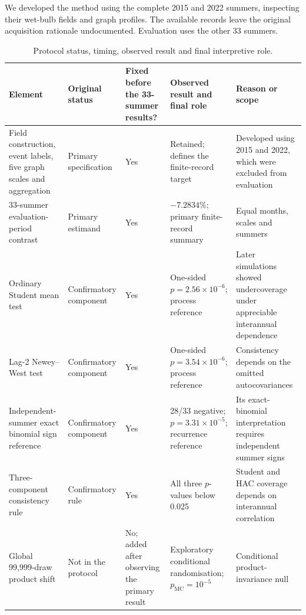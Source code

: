 \documentclass[namedate,webpdf,modern,mediumone]{oup-authoring-template}
\theoremstyle{thmstyleone}
\begin{document}
We developed the method using the complete 2015 and 2022 summers, inspecting
their wet-bulb fields and graph profiles. The available records leave the
original acquisition rationale undocumented. Evaluation uses the other
33 summers.

\footnotesize
\setlength{\tabcolsep}{3pt}
\begin{table}[!htbp]
\centering
\footnotesize
\caption{Protocol status, timing, observed result and final interpretive role.}
\label{tab:status}
\begin{tabular}{Z{0.17\textwidth}Z{0.16\textwidth}Z{0.15\textwidth}Z{0.24\textwidth}Z{0.19\textwidth}}
\toprule
Element & Original status & Fixed before the 33-summer results? & Observed result and final role & Reason or scope \\
\midrule
Field construction, event labels, five graph scales and aggregation &
Primary specification & Yes & Retained; defines the finite-record target &
Developed using 2015 and 2022, which were excluded from evaluation \\

33-summer evaluation-period contrast &
Primary estimand & Yes & $-7.2834\%$; primary finite-record summary &
Equal months, scales and summers \\

Ordinary Student mean test &
Confirmatory component & Yes & One-sided $p=2.56\times10^{-6}$; process reference &
Later simulations showed undercoverage under appreciable interannual dependence \\

Lag-2 Newey--West test &
Confirmatory component & Yes & One-sided $p=3.54\times10^{-6}$; process reference &
Consistency depends on the omitted autocovariances \\

Independent-summer exact binomial sign reference &
Confirmatory component & Yes & 28/33 negative; $p=3.31\times10^{-5}$; recurrence reference &
Its exact-binomial interpretation requires independent summer signs \\

Three-component consistency rule &
Confirmatory rule & Yes & All three $p$-values below 0.025 &
Student and HAC coverage depends on interannual correlation \\

Global 99,999-draw product shift &
Not in the protocol & No; added after observing the primary result & Exploratory conditional randomisation; $p_{\mathrm{MC}}=10^{-5}$ &
Conditional product-invariance null \\


\end{tabular}
\end{table}
\end{document}
